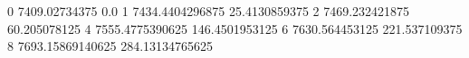 0 7409.02734375 0.0
1 7434.4404296875 25.4130859375
2 7469.232421875 60.205078125
4 7555.4775390625 146.4501953125
6 7630.564453125 221.537109375
8 7693.15869140625 284.13134765625
